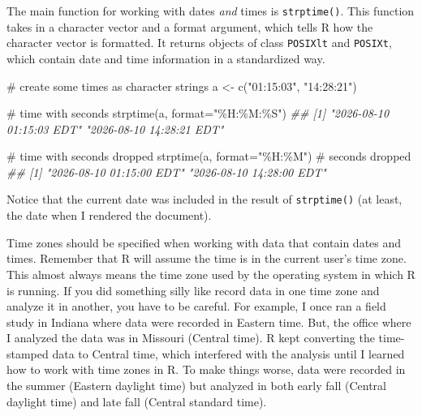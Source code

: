 \documentclass[
  13,
  letterpaper,
]{report}
\newenvironment{Shaded}{\begin{snugshade}}{\end{snugshade}}
\newcommand{\AttributeTok}[1]{\textcolor[rgb]{0.40,0.45,0.13}{#1}}
\newcommand{\CommentTok}[1]{\textcolor[rgb]{0.37,0.37,0.37}{#1}}
\newcommand{\DocumentationTok}[1]{\textcolor[rgb]{0.37,0.37,0.37}{\textit{#1}}}
\newcommand{\FunctionTok}[1]{\textcolor[rgb]{0.28,0.35,0.67}{#1}}
\newcommand{\NormalTok}[1]{\textcolor[rgb]{0.00,0.23,0.31}{#1}}
\newcommand{\OtherTok}[1]{\textcolor[rgb]{0.00,0.23,0.31}{#1}}
\newcommand{\StringTok}[1]{\textcolor[rgb]{0.13,0.47,0.30}{#1}}
\begin{document}
The main function for working with dates \emph{and} times is
\texttt{strptime()}. This function takes in a character vector and a
format argument, which tells R how the character vector is formatted. It
returns objects of class \texttt{POSIXlt} and \texttt{POSIXt}, which
contain date and time information in a standardized way.

\begin{Shaded}
\begin{Highlighting}[]

\CommentTok{\# create some times as character strings}
\NormalTok{a }\OtherTok{\textless{}{-}} \FunctionTok{c}\NormalTok{(}\StringTok{"01:15:03"}\NormalTok{, }\StringTok{"14:28:21"}\NormalTok{)}

\CommentTok{\# time with seconds}
\FunctionTok{strptime}\NormalTok{(a, }\AttributeTok{format=}\StringTok{"\%H:\%M:\%S"}\NormalTok{)}
\DocumentationTok{\#\# [1] "2026{-}08{-}10 01:15:03 EDT" "2026{-}08{-}10 14:28:21 EDT"}

\CommentTok{\# time with seconds dropped}
\FunctionTok{strptime}\NormalTok{(a, }\AttributeTok{format=}\StringTok{"\%H:\%M"}\NormalTok{)    }\CommentTok{\# seconds dropped}
\DocumentationTok{\#\# [1] "2026{-}08{-}10 01:15:00 EDT" "2026{-}08{-}10 14:28:00 EDT"}
\end{Highlighting}
\end{Shaded}

Notice that the current date was included in the result of
\texttt{strptime()} (at least, the date when I rendered the document).

Time zones should be specified when working with data that contain dates
and times. Remember that R will assume the time is in the current user's
time zone. This almost always means the time zone used by the operating
system in which R is running. If you did something silly like record
data in one time zone and analyze it in another, you have to be careful.
For example, I once ran a field study in Indiana where data were
recorded in Eastern time. But, the office where I analyzed the data was
in Missouri (Central time). R kept converting the time-stamped data to
Central time, which interfered with the analysis until I learned how to
work with time zones in R. To make things worse, data were recorded in
the summer (Eastern daylight time) but analyzed in both early fall
(Central daylight time) and late fall (Central standard time).
\end{document}
